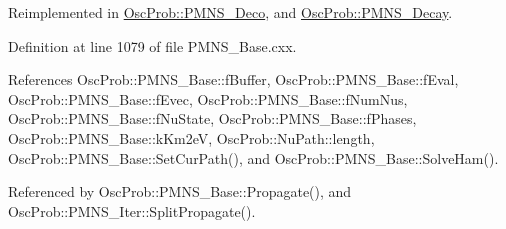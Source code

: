 Reimplemented in \hyperlink{classOscProb_1_1PMNS__Deco_aa75341a3608bb12d7792a14e67ef2d5e}{Osc\+Prob\+::\+P\+M\+N\+S\+\_\+\+Deco}, and \hyperlink{classOscProb_1_1PMNS__Decay_a12dda597f214e874e958070abc63a37c}{Osc\+Prob\+::\+P\+M\+N\+S\+\_\+\+Decay}.



Definition at line 1079 of file P\+M\+N\+S\+\_\+\+Base.\+cxx.



References Osc\+Prob\+::\+P\+M\+N\+S\+\_\+\+Base\+::f\+Buffer, Osc\+Prob\+::\+P\+M\+N\+S\+\_\+\+Base\+::f\+Eval, Osc\+Prob\+::\+P\+M\+N\+S\+\_\+\+Base\+::f\+Evec, Osc\+Prob\+::\+P\+M\+N\+S\+\_\+\+Base\+::f\+Num\+Nus, Osc\+Prob\+::\+P\+M\+N\+S\+\_\+\+Base\+::f\+Nu\+State, Osc\+Prob\+::\+P\+M\+N\+S\+\_\+\+Base\+::f\+Phases, Osc\+Prob\+::\+P\+M\+N\+S\+\_\+\+Base\+::k\+Km2eV, Osc\+Prob\+::\+Nu\+Path\+::length, Osc\+Prob\+::\+P\+M\+N\+S\+\_\+\+Base\+::\+Set\+Cur\+Path(), and Osc\+Prob\+::\+P\+M\+N\+S\+\_\+\+Base\+::\+Solve\+Ham().



Referenced by Osc\+Prob\+::\+P\+M\+N\+S\+\_\+\+Base\+::\+Propagate(), and Osc\+Prob\+::\+P\+M\+N\+S\+\_\+\+Iter\+::\+Split\+Propagate().


